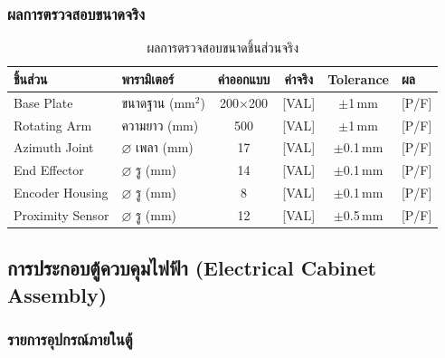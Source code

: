 \subsubsection{ผลการตรวจสอบขนาดจริง}
\label{subsubsec:dimension_verification}

\begin{table}[H]
  \centering
  \caption{ผลการตรวจสอบขนาดชิ้นส่วนจริง}
  \label{tab:mech_inspection}
  \begin{tabular}{llcccl}
    \toprule
    ชิ้นส่วน & พารามิเตอร์ & ค่าออกแบบ & ค่าจริง & Tolerance & ผล \\
    \midrule
    Base Plate        & ขนาดฐาน (mm$^2$) & 200$\times$200 & [VAL] & $\pm$1\,mm & [P/F] \\
    Rotating Arm      & ความยาว (mm)     & 500            & [VAL] & $\pm$1\,mm & [P/F] \\
    Azimuth Joint     & $\diameter$ เพลา (mm) & 17        & [VAL] & $\pm$0.1\,mm & [P/F] \\
    End Effector      & $\diameter$ รู (mm)   & 14        & [VAL] & $\pm$0.1\,mm & [P/F] \\
    Encoder Housing   & $\diameter$ รู (mm)   & 8         & [VAL] & $\pm$0.1\,mm & [P/F] \\
    Proximity Sensor  & $\diameter$ รู (mm)   & 12        & [VAL] & $\pm$0.5\,mm & [P/F] \\
    \bottomrule
  \end{tabular}
\end{table}

\subsection{การประกอบตู้ควบคุมไฟฟ้า (Electrical Cabinet Assembly)}
\label{subsec:electrical_cabinet_assembly}

\subsubsection{รายการอุปกรณ์ภายในตู้}
\label{subsubsec:cabinet_equipment_list}

